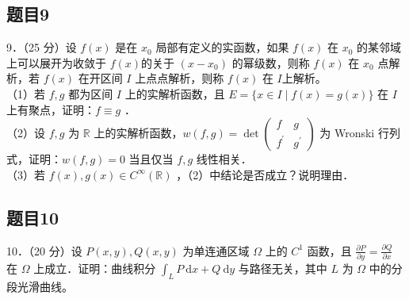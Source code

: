 \documentclass{article}
\begin{document}
\subsection{题目9}
9．（25 分）设 \(f(x)\) 是在 \(x_{0}\) 局部有定义的实函数，如果 \(f(x)\) 在 \(x_{0}\) 的某邻域上可以展开为收敛于 \(f(x)\)的关于 \(\left(x-x_{0}\right)\) 的幂级数，则称 \(f(x)\) 在 \(x_{0}\) 点解析，若 \(f(x)\) 在开区间 \(I\) 上点点解析，则称 \(f(x)\) 在 \(I\)上解析。\\
（1）若 \(f, g\) 都为区间 \(I\) 上的实解析函数，且 \(E=\{x \in I \mid f(x)=g(x)\}\) 在 \(I\) 上有聚点，证明：\(f \equiv g\) ．\\
（2）设 \(f, g\) 为 \(\mathbb{R}\) 上的实解析函数，\(w(f, g)=\operatorname{det}\left(\begin{array}{cc}f & g \\ f^{\prime} & g^{\prime}\end{array}\right)\) 为 Wronski 行列式，证明：\(w(f, g)=0\) 当且仅当 \(f, g\) 线性相关．\\
（3）若 \(f(x), g(x) \in C^{\infty}(\mathbb{R})\) ，（2）中结论是否成立？说明理由．

\subsection{题目10}
10．（20 分）设 \(P(x, y), Q(x, y)\) 为单连通区域 \(\Omega\) 上的 \(C^{1}\) 函数，且 \(\frac{\partial P}{\partial y}=\frac{\partial Q}{\partial x}\) 在 \(\Omega\) 上成立．证明：曲线积分 \(\int_{L} P \mathrm{~d} x+Q \mathrm{~d} y\) 与路径无关，其中 \(L\) 为 \(\Omega\) 中的分段光滑曲线。
\end{document}

